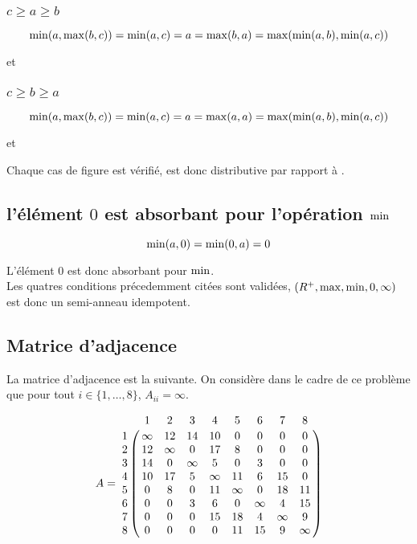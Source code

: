 \documentclass{article}
\begin{document}
\subsubsection{$c \geq a \geq b$}

$$\operatorname{min}(a, \operatorname{max}(b, c)) = \operatorname{min}(a,c) = a = \operatorname{max}(b,a) = \operatorname{max}(\operatorname{min}(a, b),\operatorname{min}(a,c))$$
\begin{center}et\end{center}

\subsubsection{$c \geq b \geq a$}

$$\operatorname{min}(a, \operatorname{max}(b, c)) = \operatorname{min}(a,c) = a = \operatorname{max}(a,a) = \operatorname{max}(\operatorname{min}(a, b),\operatorname{min}(a,c))$$
\begin{center}et\end{center}

Chaque cas de figure est vérifié, \mmin\; est donc distributive par rapport à \mmax.

\subsection{l'élément  $0$ est absorbant pour l'opération $\operatorname{min}$}

$$
\operatorname{min}(a,0) = \operatorname{min}(0,a) = 0
$$

L'élément $0$ est donc absorbant pour $\operatorname{min}$.\\

Les quatres conditions précedemment citées sont validées, $(R^+,
\operatorname{max}, \operatorname{min}, 0, \infty)$ est donc un
semi-anneau idempotent.

\subsection{Matrice d'adjacence}

La matrice d'adjacence est la suivante. On considère dans le cadre de
ce problème que pour tout $i \in \{1,\dots,8\}$, $A_{ii} = \infty$.

$$
A = \bordermatrix{
    & 1 & 2 & 3 & 4 & 5 & 6 & 7 & 8 \cr
  1 & \infty & 12 & 14 & 10 & 0 & 0 & 0 & 0 \cr
  2 & 12 & \infty & 0 & 17 & 8 & 0 & 0 & 0 \cr
  3 & 14 & 0 & \infty & 5 & 0 & 3 & 0 & 0 \cr
  4 & 10 & 17 & 5 & \infty & 11 & 6 & 15 & 0 \cr
  5 & 0 & 8 & 0 & 11 & \infty & 0 & 18 & 11 \cr
  6 & 0 & 0 & 3 & 6 & 0 & \infty & 4 & 15 \cr
  7 & 0 & 0 & 0 & 15 & 18 & 4 & \infty & 9 \cr
  8 & 0 & 0 & 0 & 0 & 11 & 15 & 9 & \infty
}
$$
\end{document}
